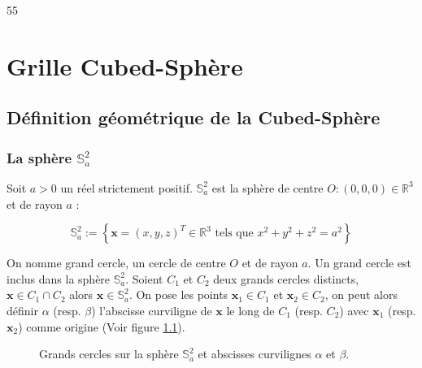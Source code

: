 
55\chapter{Grille Cubed-Sphère}

\section{Définition géométrique de la Cubed-Sphère}

\subsection{La sphère $\mathbb{S}_a^2$}

Soit $a > 0$ un réel strictement positif. $\mathbb{S}_a^2$ est la sphère de centre $O : (0,0,0) \in \mathbb{R}^3$ et de rayon $a$ :

\begin{equation}
\mathbb{S}_a^2 := \left\lbrace
\mathbf{x} = (x,y,z)^T \in \mathbb{R}^3 \text{ tels que } x^2+y^2+z^2 = a^2
\right\rbrace
\end{equation} 

On nomme grand cercle, un cercle de centre $O$ et de rayon $a$. Un grand cercle est inclus dans la sphère $\mathbb{S}_a^2$.
Soient $C_1$ et $C_2$ deux grands cercles distincts, $\mathbf{x} \in C_1 \cap C_2$ alors $\mathbf{x} \in \mathbb{S}_a^2$.
On pose les points $\mathbf{x}_1 \in C_1$ et $\mathbf{x}_2 \in C_2$, on peut alors définir $\alpha$ (resp. $\beta$) l’abscisse curviligne de $\mathbf{x}$ le long de $C_1$ (resp. $C_2$) avec $\mathbf{x}_1$ (resp. $\mathbf{x}_2$) comme origine (Voir figure \ref{fig: grands cercles}).


\begin{figure}[ht]
\begin{center}
\end{center}
\caption{Grands cercles sur la sphère $\mathbb{S}_a^2$ et abscisses curvilignes $\alpha$ et $\beta$.}
\label{fig: grands cercles}
\end{figure}

